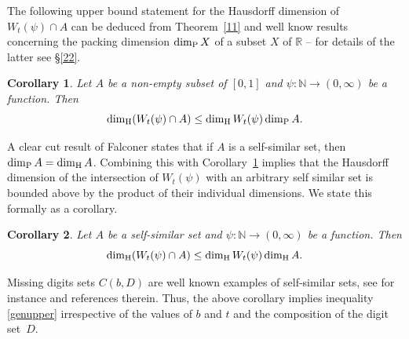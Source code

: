 \documentclass[12pt]{article}
\newtheorem{corollary}{Corollary}[section]
\theoremstyle{definition}
\theoremstyle{remark}
\begin{document}
The following  upper bound  statement for the Hausdorff dimension of $ W_{t}(\psi)\cap A  $ can be deduced from Theorem~\ref{11} and well know results concerning the packing dimension $\dim_{\rm P}X$ of a subset $X$ of $\mathbb{R}$ -- for details of the latter  see  \S\ref{22}. 

\begin{corollary}\label{17}
Let $A$ be a non-empty subset of $[0,1]$ and $\psi:\mathbb{N}\to(0,\infty)$ be a function. Then
\begin{equation*}
\dim_{\rm H}(W_{t}(\psi)\cap A)\le\dim_{\rm H}W_{t}(\psi)\dim_{\rm P}A.
\end{equation*}
\end{corollary}


A clear cut  result of  Falconer \cite[Theorem 4]{F1989}  states that if $A$ is a self-similar set,  then
$\dim_{\rm P}A=\dim_{\rm H}A $. 
Combining this  with Corollary~\ref{17} implies  that the Hausdorff dimension of the intersection of $ W_{t}(\psi)$ with an arbitrary self similar set is bounded above by the product of their individual dimensions.  We state this formally as a corollary.  


\begin{corollary}\label{110}
Let $A$ be a self-similar set and $\psi:\mathbb{N}\to(0,\infty)$ be a function. Then
\begin{equation*}
\dim_{\rm H}(W_{t}(\psi)\cap A)\le\dim_{\rm H}W_{t}(\psi)\dim_{\rm H}A.
\end{equation*}
\end{corollary}

\medskip 

\noindent Missing digits sets $C(b,D)$ are well known examples of self-similar sets, see for instance \cite[Chapter 9]{F2003} and references therein.  Thus, the above corollary implies inequality  \eqref{genupper}  irrespective  of the values of $b$ and  $t$ and the composition of the digit set~$D$. 
\end{document}

